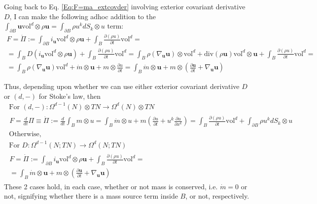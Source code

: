 \documentclass[twoside,landscape,10pt]{amsart}
\theoremstyle{plain}
\theoremstyle{definition}
\theoremstyle{remark}
\theoremstyle{remark}
\begin{document}
\begin{multicols*}{2}
Going back to Eq. \ref{Eq:F=ma_extcovder} involving exterior covariant derivative $D$, I can make the following adhoc addition to the $\int_{\partial B} {\mathbf{u}} \text{vol}^d \otimes \rho \mathbf{u} = \int_{\partial B} \rho u^k dS_k \otimes u $ term:
\[
\begin{gathered}
  F = \dot{\Pi} := \int_{\partial B} i_{\mathbf{u}} \text{vol}^d \otimes \rho \mathbf{u}  + \int_B \frac{ \partial (\rho u)}{ \partial t} \text{vol}^d =  \\
   = \int_B D(i_{\mathbf{u}} \text{vol}^d\otimes \rho \mathbf{u})  + \int_B \frac{ \partial (\rho u )}{ \partial t} \text{vol}^d = \int_B \rho (\nabla_{\mathbf{u}} \mathbf{u} ) \otimes \text{vol}^d + \text{div}(\rho \mathbf{u}) \text{vol}^d \otimes \mathbf{u} + \int_B \frac{ \partial ( \rho u )}{ \partial t} \text{vol}^d = \\
  = \int_B \rho(\nabla_{\mathbf{u}} \mathbf{u} ) \text{vol}^d + \dot{m} \otimes \mathbf{u} + m \otimes \frac{ \partial u }{ \partial t} = \boxed{ \int_B \dot{m} \otimes \mathbf{u} + m \otimes \left( \frac{ \partial \mathbf{u}}{ \partial t} + \nabla_{\mathbf{u}} \mathbf{u} \right) }
\end{gathered}
\]

Thus, depending upon whether we can use either exterior covariant derivative $D$  or $(d,-)$ for Stoke's law, then 
\begin{equation}\label{Eq:momentumtheorems}
\boxed{
\begin{gathered}
\text{ For } (d,-):  \Omega^{d-1}(N) \otimes TN \to \Omega^{d}(N) \otimes TN \\
\begin{gathered}
  F = \frac{d}{dt} \Pi \equiv \dot{\Pi} := \frac{d}{dt} \int_B m \otimes u = \int_B \dot{m} \otimes u + m \left( \frac{ \partial u}{ \partial t} + u^k \frac{ \partial u}{ \partial x^k} \right) = \int_B \frac{ \partial (\rho u)}{ \partial t} \text{vol}^d + \int_{ \partial B} \rho u^k dS_k \otimes u 
\end{gathered} \\
\text{ Otherwise, } \\
\text{ For } D:\Omega^{d-1}(N;TN)\to \Omega^{d}(N;TN) \\
\begin{gathered}
  F = \dot{\Pi} := \int_{\partial B} i_{\mathbf{u}} \text{vol}^d \otimes \rho \mathbf{u}  + \int_B \frac{ \partial (\rho u)}{ \partial t} \text{vol}^d =  \\
 =  \int_B \dot{m} \otimes \mathbf{u} + m \otimes \left( \frac{ \partial \mathbf{u}}{ \partial t} + \nabla_{\mathbf{u}} \mathbf{u} \right) 
\end{gathered}
\end{gathered}
}
\end{equation}
These 2 cases hold, in each case, whether or not mass is conserved, i.e. $\dot{m}=0$ or not, signifying whether there is a mass source term inside $B$, or not, respectively.  


\end{multicols*}
\end{document}
